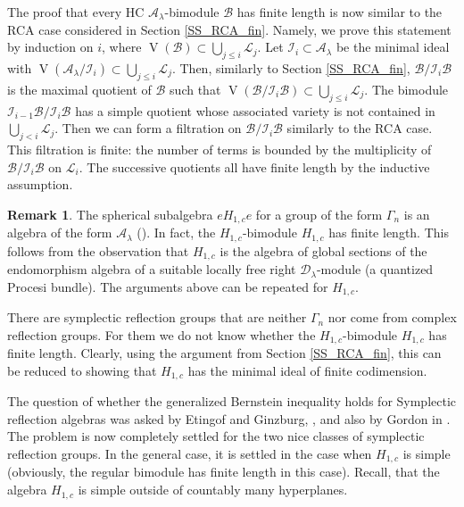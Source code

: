 \documentclass[12pt]{amsart}
\newcommand{\A}{\mathcal{A}}
\newcommand{\I}{\mathcal{I}}
\newcommand{\VA}{\operatorname{V}}
\newcommand{\B}{\mathcal{B}}
\theoremstyle{definition}
\newtheorem{Rem}[Thm]{Remark}
\begin{document}
The proof that  every HC $\A_\lambda$-bimodule $\B$ has finite length is now similar to the RCA
case considered in Section \ref{SS_RCA_fin}. Namely, we prove this statement by induction on $i$, where $\VA(\B)\subset
\bigcup_{j\leqslant i}\mathcal{L}_j$. Let $\I_i\subset \A_\lambda$ be the minimal
ideal with $\VA(\A_\lambda/\I_i)\subset \bigcup_{j\leqslant i}\mathcal{L}_j$.
Then, similarly to Section \ref{SS_RCA_fin}, $\B/\I_i\B$ is the maximal quotient of $\B$ such that $\VA(\B/\I_i\B)\subset
\bigcup_{j\leqslant i}\mathcal{L}_j$. The bimodule $\I_{i-1}\B/\I_i\B$ has a simple
quotient whose associated variety is not contained in $\bigcup_{j<i}\mathcal{L}_j$.
Then we can form a filtration on $\B/\I_i\B$ similarly to the RCA case. This filtration
is finite: the number of terms is bounded by the multiplicity of $\B/\I_i\B$ on $\mathcal{L}_i$.
The successive quotients all have finite length by the inductive assumption.

\begin{Rem}\label{Rem:SRA}
The spherical subalgebra $eH_{1,c}e$ for a group of the form $\Gamma_n$ is an algebra of the form
$\A_\lambda$ (\cite[Section 6]{quant}). In fact, the $H_{1,c}$-bimodule $H_{1,c}$ has finite length.
This follows from the observation that $H_{1,c}$ is the algebra of global sections
of the endomorphism algebra of a suitable locally free right $\mathcal{D}_\lambda$-module
(a quantized Procesi bundle). The arguments above can be repeated for $H_{1,c}$.

There are symplectic reflection groups that are neither $\Gamma_n$ nor come from
complex reflection groups. For them we do not know whether the $H_{1,c}$-bimodule
$H_{1,c}$ has finite length. Clearly, using the argument from Section \ref{SS_RCA_fin},
this can be reduced to showing that $H_{1,c}$ has the minimal ideal of finite codimension.

The question of whether the generalized Bernstein inequality holds for Symplectic reflection
algebras was asked by Etingof and Ginzburg, \cite{EG_problems}, and also by Gordon in \cite{Gordon_review}.
The problem is now completely settled for the two nice classes
of symplectic reflection groups. In the general case, it is settled in the case when
$H_{1,c}$ is simple (obviously, the regular bimodule has finite length in this case).
Recall, \cite[Theorem 1.4.2, Section 4.2]{sraco} that the algebra $H_{1,c}$
is simple outside of countably many hyperplanes.
\end{Rem}
\end{document}
